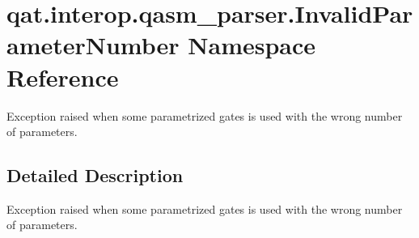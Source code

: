 \hypertarget{namespaceqat_1_1interop_1_1qasm__parser_1_1InvalidParameterNumber}{\section{qat.\-interop.\-qasm\-\_\-parser.\-Invalid\-Parameter\-Number Namespace Reference}
\label{namespaceqat_1_1interop_1_1qasm__parser_1_1InvalidParameterNumber}
}


Exception raised when some parametrized gates is used with the wrong number of parameters.  




\subsection{Detailed Description}
Exception raised when some parametrized gates is used with the wrong number of parameters. 